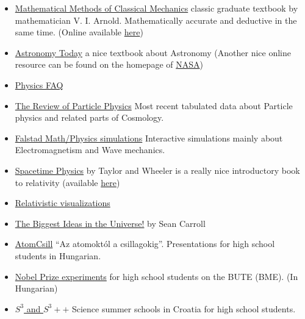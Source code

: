 \documentclass{article}
\begin{document}
\begin{itemize}
\item \href{https://www.springer.com/gp/book/9780387968902}{Mathematical Methods of Classical Mechanics} classic graduate textbook by mathematician V. I. Arnold. Mathematically accurate and deductive in the same time. (Online available \href{https://loshijosdelagrange.files.wordpress.com/2013/04/v-arnold-mathematical-methods-of-classical-mechanics-1989.pdf}{here})

\item \href{https://www.goodreads.com/book/show/23512.Astronomy_Today}{Astronomy Today} a nice textbook about Astronomy (Another nice online resource can be found on the homepage of \href{https://solarsystem.nasa.gov/basics/}{NASA})

\item \href{https://math.ucr.edu/home/baez/physics/index.html}{Physics FAQ}

\item \href{http://pdg.lbl.gov/}{The Review of Particle Physics} Most recent tabulated data about Particle physics and related parts of Cosmology.

\item \href{https://www.falstad.com/mathphysics.html}{Falstad Math/Physics simulations} Interactive simulations mainly about Electromagnetism and Wave mechanics.

\item \href{https://www.goodreads.com/book/show/1000529.Spacetime_Physics}{Spacetime Physics} by Taylor and Wheeler is a really nice introductory book to relativity (available \href{http://www.gvp.cz/~vinkle/mafynet/_F/str/151621272-Spacetime-Physics-2nd-Ed-Taylor-Wheeler-0716723271.pdf}{here})

\item \href{https://www.spacetimetravel.org/}{Relativistic visualizations}

\item \href{https://www.youtube.com/playlist?list=PLrxfgDEc2NxZJcWcrxH3jyjUUrJlnoyzX}{The Biggest Ideas in the Universe!} by Sean Carroll 

\item \href{http://atomcsill.elte.hu/}{AtomCsill} ``Az atomoktól a csillagokig''. Presentations for high school students in Hungarian.

\item \href{http://felvi.physics.bme.hu/nobeldijas}{Nobel Prize experiments} for high school students on the BUTE (BME). (In Hungarian)

\item \href{https://drustvo-evo.hr/s3/}{$S^3$ and $S^3++$} Science summer schools in Croatia for high school students.


\end{itemize}
\end{document}
